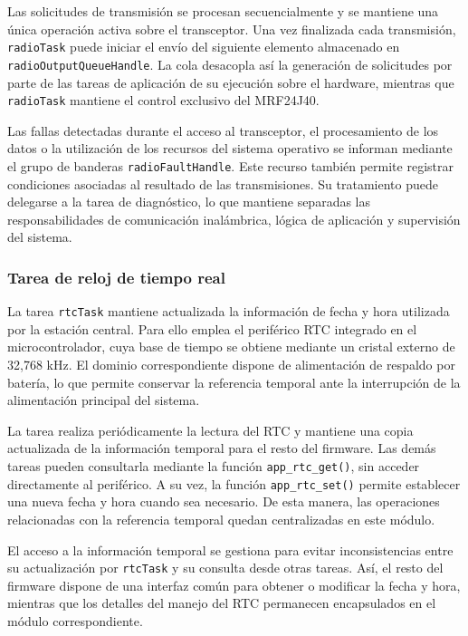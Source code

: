 Las solicitudes de transmisión se procesan secuencialmente y se mantiene una única operación activa sobre el transceptor. Una vez finalizada cada transmisión, \texttt{radioTask} puede iniciar el envío del siguiente elemento almacenado en \texttt{radioOutputQueueHandle}. La cola desacopla así la generación de solicitudes por parte de las tareas de aplicación de su ejecución sobre el hardware, mientras que \texttt{radioTask} mantiene el control exclusivo del MRF24J40.

Las fallas detectadas durante el acceso al transceptor, el procesamiento de los datos o la utilización de los recursos del sistema operativo se informan mediante el grupo de banderas \texttt{radioFaultHandle}. Este recurso también permite registrar condiciones asociadas al resultado de las transmisiones. Su tratamiento puede delegarse a la tarea de diagnóstico, lo que mantiene separadas las responsabilidades de comunicación inalámbrica, lógica de aplicación y supervisión del sistema.


\subsubsection{Tarea de reloj de tiempo real}

La tarea \texttt{rtcTask} mantiene actualizada la información de fecha y hora utilizada por la estación central. Para ello emplea el periférico RTC integrado en el microcontrolador, cuya base de tiempo se obtiene mediante un cristal externo de 32,768 kHz. El dominio correspondiente dispone de alimentación de respaldo por batería, lo que permite conservar la referencia temporal ante la interrupción de la alimentación principal del sistema.

La tarea realiza periódicamente la lectura del RTC y mantiene una copia actualizada de la información temporal para el resto del firmware. Las demás tareas pueden consultarla mediante la función \texttt{app\_rtc\_get()}, sin acceder directamente al periférico. A su vez, la función \texttt{app\_rtc\_set()} permite establecer una nueva fecha y hora cuando sea necesario. De esta manera, las operaciones relacionadas con la referencia temporal quedan centralizadas en este módulo.

El acceso a la información temporal se gestiona para evitar inconsistencias entre su actualización por \texttt{rtcTask} y su consulta desde otras tareas. Así, el resto del firmware dispone de una interfaz común para obtener o modificar la fecha y hora, mientras que los detalles del manejo del RTC permanecen encapsulados en el módulo correspondiente.

